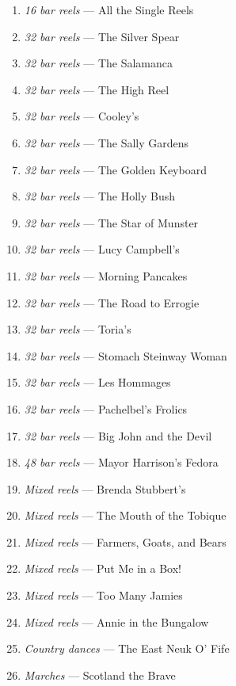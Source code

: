 \documentclass[11pt]{article}
\begin{document}
\begin{multicols*}{2}
\begin{enumerate}
        \item[] \textit{16 bar reels} --- All the Single Reels
        \item[] \textit{32 bar reels} --- The Silver Spear
        \item[] \textit{32 bar reels} --- The Salamanca
        \item[] \textit{32 bar reels} --- The High Reel
        \item[] \textit{32 bar reels} --- Cooley's
        \item[] \textit{32 bar reels} --- The Sally Gardens
        \item[] \textit{32 bar reels} --- The Golden Keyboard
        \item[] \textit{32 bar reels} --- The Holly Bush
        \item[] \textit{32 bar reels} --- The Star of Munster
        \item[] \textit{32 bar reels} --- Lucy Campbell's
        \item[] \textit{32 bar reels} --- Morning Pancakes
        \item[] \textit{32 bar reels} --- The Road to Errogie
        \item[] \textit{32 bar reels} --- Toria's
        \item[] \textit{32 bar reels} --- Stomach Steinway Woman
        \item[] \textit{32 bar reels} --- Les Hommages
        \item[] \textit{32 bar reels} --- Pachelbel's Frolics
        \item[] \textit{32 bar reels} --- Big John and the Devil
        \item[] \textit{48 bar reels} --- Mayor Harrison's Fedora
        \item[] \textit{Mixed reels} --- Brenda Stubbert's
        \item[] \textit{Mixed reels} --- The Mouth of the Tobique
        \item[] \textit{Mixed reels} --- Farmers, Goats, and Bears
        \item[] \textit{Mixed reels} --- Put Me in a Box!
        \item[] \textit{Mixed reels} --- Too Many Jamies
        \item[] \textit{Mixed reels} --- Annie in the Bungalow
        \item[] \textit{Country dances} --- The East Neuk O' Fife
        \item[] \textit{Marches} --- Scotland the Brave

\end{enumerate}
\end{multicols*}
\end{document}
